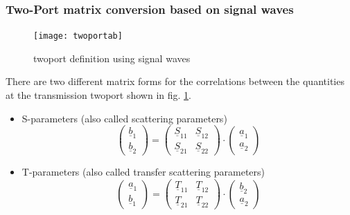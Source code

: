 \documentclass[10pt]{report}
\begin{document}
\subsubsection{Two-Port matrix conversion based on signal waves}

\begin{figure}[ht]
\begin{center}
\texttt{[image: twoportab]}
\end{center}
\caption{twoport definition using signal waves}
\label{fig:twoportab}
\end{figure}
\FloatBarrier

There are two different matrix forms for the correlations between the
quantities at the transmission twoport shown in
fig. \ref{fig:twoportab}.

\begin{itemize}

\item S-parameters (also called scattering parameters)
\begin{equation}
\begin{pmatrix}
\underline{b}_{1}\\
\underline{b}_{2}
\end{pmatrix}
=
\begin{pmatrix}
\underline{S}_{11} & \underline{S}_{12}\\
\underline{S}_{21} & \underline{S}_{22}
\end{pmatrix}
\cdot
\begin{pmatrix}
\underline{a}_{1}\\
\underline{a}_{2}
\end{pmatrix}
\end{equation}

\item T-parameters (also called transfer scattering parameters)
\begin{equation}
\begin{pmatrix}
\underline{a}_{1}\\
\underline{b}_{1}
\end{pmatrix}
=
\begin{pmatrix}
\underline{T}_{11} & \underline{T}_{12}\\
\underline{T}_{21} & \underline{T}_{22}
\end{pmatrix}
\cdot
\begin{pmatrix}
\underline{b}_{2}\\
\underline{a}_{2}
\end{pmatrix}
\end{equation}

\end{itemize}
\end{document}
